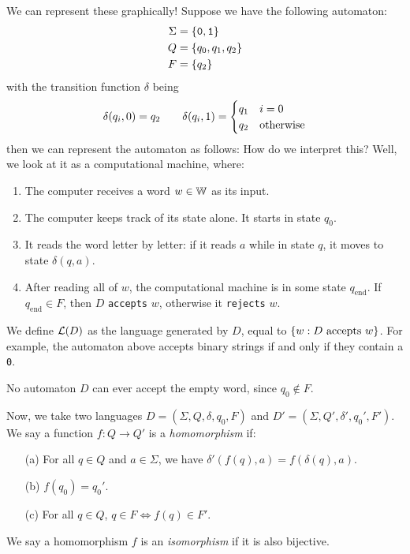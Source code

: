\documentclass{article}
\begin{document}
\begin{remark}
	We can represent these graphically! Suppose we have the following automaton:
	\begin{align*}
		\Sigma & = \left\lbrace \texttt{0}, \texttt{1} \right\rbrace             \\
		Q      & = \left\lbrace q_0, q_1, q_2 \right\rbrace \\
		F      & = \left\lbrace q_2 \right\rbrace           
	\end{align*}
	with the transition function $\delta$ being
	\[
		\delta(q_i, 0) = q_2 \qquad \delta(q_i, 1) = \begin{cases}
		q_1 & i=0 \\ q_2 & \!\mathrel{\, \text{otherwise}}
		\end{cases}
	\]
	then we can represent the automaton as follows:
	How do we interpret this? Well, we look at it as a computational machine, where:
	\begin{enumerate}
		\item The computer receives a word $w \in \mathbb{W}$ as its input.
		\item The computer keeps track of its state alone. It starts in state $q_0$.
		\item It reads the word letter by letter: if it reads $a$ while in state $q$, it moves to state $\delta(q, a)$.
		\item After reading all of $w$, the computational machine is in some state $q_\text{end}$. If $q_\text{end} \in F$, then $D$ \texttt{accepts} $w$, otherwise it \texttt{rejects} $w$.
	\end{enumerate}
	We define $\mathcal{L}(D)$ as the language generated by $D$, equal to $\left\lbrace w : D \text{ accepts } w \right\rbrace$. For example, the automaton above accepts binary strings if and only if they contain a \texttt{0}.
\end{remark}

\begin{note}
	No automaton $D$ can ever accept the empty word, since $q_0 \notin F$.
\end{note}

\begin{definition}
	Now, we take two languages $D = (\Sigma, Q, \delta, q_0, F)$ and $D' = (\Sigma, Q', \delta', q_0', F')$. We say a function $f: Q \to Q'$ is a \textit{homomorphism} if:
	\begin{enumerate}
		\item[(a)] For all $q \in Q$ and $a \in \Sigma$, we have $\delta'(f(q), a) = f(\delta(q), a)$.
		\item[(b)] $f(q_0) = q_0'$.
		\item[(c)] For all $q \in Q$, $q \in F \iff f(q) \in F'$.
	\end{enumerate}
	We say a homomorphism $f$ is an \textit{isomorphism} if it is also bijective.
\end{definition}
\end{document}
